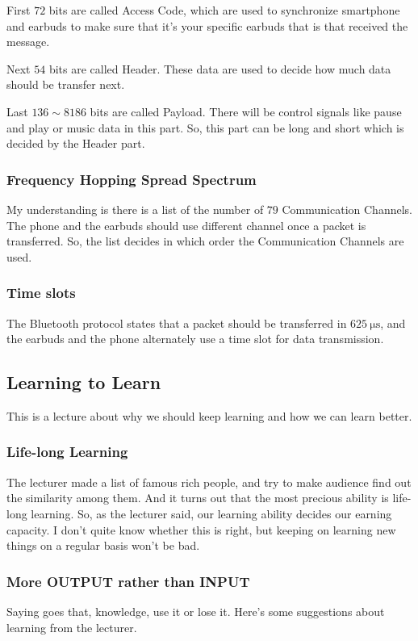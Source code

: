 \documentclass{article}
\begin{document}
First $72$ bits are called {Access Code}, which are used to synchronize smartphone and earbuds to make sure that it's your specific earbuds that is that received the message. 

Next $54$ bits are called {Header}. These data are used to decide how much data should be transfer next.

Last $136 \sim 8186$ bits are called {Payload}. There will be control signals like pause and play or music data in this part. So, this part can be long and short which is decided by the {Header} part.

\subsubsection*{Frequency Hopping Spread Spectrum}
My understanding is there is a list of the number of $79$ Communication Channels. The phone and the earbuds should use different channel once a packet is transferred. So, the list decides in which order the Communication Channels are used.

\subsubsection*{Time slots}
The Bluetooth protocol states that a packet should be transferred in $625~ \mathrm{\mu s}$, and the earbuds and the phone alternately use a time slot for data transmission.


\subsection{Learning to Learn}
This is a lecture about why we should keep learning and how we can learn better.
\subsubsection*{Life-long Learning}
The lecturer made a list of famous rich people, and try to make audience find out the similarity among them. And it turns out that the most precious ability is life-long learning. So, as the lecturer said, our learning ability decides our earning capacity. I don't quite know whether this is right, but keeping on learning new things on a regular basis won't be bad.

\subsubsection*{More OUTPUT rather than INPUT}
Saying goes that, knowledge, use it or lose it. Here's some suggestions about learning from the lecturer.
\end{document}

